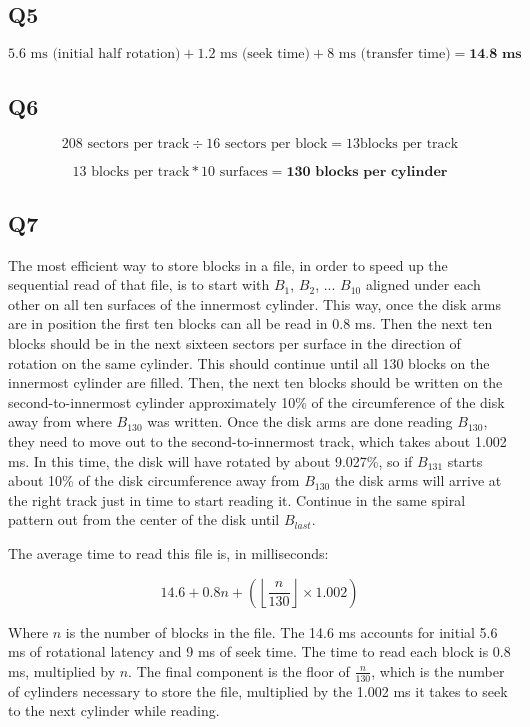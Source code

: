 \documentclass[a4paper, 12pt]{article}
\begin{document}
\subsection*{Q5}

\[ 5.6 \text{ ms (initial half rotation)} + 1.2 \text{ ms (seek time)} + 8
		\text{ ms (transfer time)} = \textbf{14.8 ms} \]

\subsection*{Q6}

\[ 208 \text{ sectors per track} \div 16 \text{ sectors per block} = 13 \text{
				blocks per track} \]

\[ 13 \text{ blocks per track} * 10 \text{ surfaces} = \textbf{130 blocks per
				cylinder} \]

\subsection*{Q7}

The most efficient way to store blocks in a file, in order to speed up the
sequential read of that file, is to start with $B_1$, $B_2$, ... $B_{10}$
aligned under each other on all ten surfaces of the innermost cylinder. This
way, once the disk arms are in position the first ten blocks can all be read in
0.8 ms. Then the next ten blocks should be in the next sixteen sectors per
surface in the direction of rotation on the same cylinder. This should continue
until all 130 blocks on the innermost cylinder are filled. Then, the next ten
blocks should be written on the second-to-innermost cylinder approximately 10\%
of the circumference of the disk away from where $B_{130}$ was written. Once the
disk arms are done reading $B_{130}$, they need to move out to the
second-to-innermost track, which takes about 1.002 ms. In this time, the disk
will have rotated by about 9.027\%, so if $B_{131}$ starts about 10\% of the
disk circumference away from $B_{130}$ the disk arms will arrive at the right
track just in time to start reading it.  Continue in the same spiral pattern out
from the center of the disk until $B_{last}$.

The average time to read this file is, in milliseconds:

\[ 14.6 + 0.8 n + \left ( \left \lfloor{\frac{n}{130}}\right \rfloor \times
				1.002 \right ) \]

Where $n$ is the number of blocks in the file. The 14.6 ms accounts for initial
5.6 ms of rotational latency and 9 ms of seek time. The time to read each block
is 0.8 ms, multiplied by $n$. The final component is the floor of
$ \frac{n}{130} $, which is the number of cylinders necessary to store the file,
multiplied by the 1.002 ms it takes to seek to the next cylinder while reading.
\end{document}
